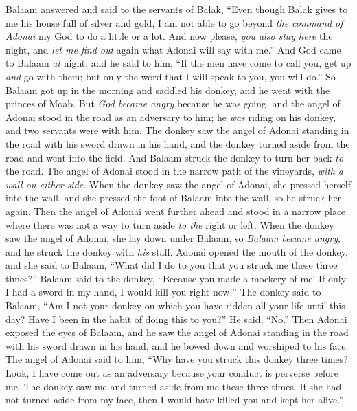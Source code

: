 \begin{biblechapter}
\verse Balaam answered and said to the servants of Balak, “Even though Balak gives to me his house full of silver and gold, I am not able to go beyond \textit{the command of Adonai} my God to do a little or a lot.
\verse And now please, \textit{you also stay here} the night, and \textit{let me find out} again what Adonai will say with me.”
\verse And God came to Balaam \textit{at} night, and he said to him, “If the men have come to call you, get up \textit{and} go with them; but only the word that I will speak to you, you will do.”
\verse So Balaam got up in the morning and saddled his donkey, and he went with the princes of Moab.
 But \textit{God became angry} because he was going, and the angel of Adonai stood in the road as an adversary to him; he \textit{was} riding on his donkey, and two servants were with him.
\verse The donkey saw the angel of Adonai standing in the road with his sword drawn in his hand, and the donkey turned aside from the road and went into the field. And Balaam struck the donkey to turn her back \textit{to} the road.
\verse The angel of Adonai stood in the narrow path of the vineyards, \textit{with} \textit{a wall on either side}.
\verse When the donkey saw the angel of Adonai, she pressed herself into the wall, and she pressed the foot of Balaam into the wall, so he struck her again.
\verse Then the angel of Adonai went further ahead and stood in a narrow place where there was not a way to turn aside \textit{to the} right or left.
\verse When the donkey saw the angel of Adonai, she lay down under Balaam, so \textit{Balaam became angry}, and he struck the donkey with \textit{his} staff.
\verse Adonai opened the mouth of the donkey, and she said to Balaam, “What did I do to you that you struck me these three times?”
\verse Balaam said to the donkey, “Because you made a mockery of me! If only I had a sword in my hand, I would kill you right now!”
\verse The donkey said to Balaam, “Am I not your donkey on which you have ridden all your life until this day? Have I been in the habit of doing this to you?” He said, “No.”
\verse Then Adonai exposed the eyes of Balaam, and he saw the angel of Adonai standing in the road with his sword drawn in his hand, and he bowed down and worshiped to his face.
\verse The angel of Adonai said to him, “Why have you struck this donkey three times? Look, I have come out as an adversary because your conduct is perverse before me.
\verse The donkey saw me and turned aside from me these three times. If she had not turned aside from my face, then I would have killed you and kept her alive.”

\end{biblechapter}
